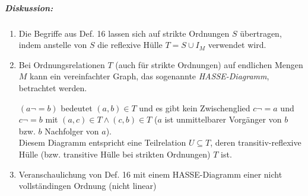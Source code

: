 \subparagraph{Diskussion:} 
\begin{enumerate}
\item Die Begriffe aus Def. 16 lassen sich auf strikte Ordnungen $S$ übertragen, indem anstelle von $S$ die reflexive Hülle $T=S \cup I_M$ verwendet wird.
\item Bei Ordnungsrelationen $T$ (auch für strikte Ordnungen) auf endlichen Mengen $M$ kann ein vereinfachter Graph, das sogenannte \emph{HASSE-Diagramm}, betrachtet werden.\\
$(a\neg = b)$ bedeutet $(a,b) \in T$ und es gibt kein Zwischenglied $c \neg = a$ und $c\neg = b$ mit $(a,c) \in T \wedge (c,b) \in T$ ($a$ ist unmittelbarer Vorgänger von $b$ bzw. $b$ Nachfolger von $a$).\\
Diesem Diagramm entspricht eine Teilrelation $U \subseteq T$, deren transitiv-reflexive Hülle (bzw. transitive Hülle bei strikten Ordnungen) $T$ ist.
\item Veranschaulichung von Def. 16 mit einem HASSE-Diagramm einer nicht vollständingen Ordnung (nicht linear)\\
\end{enumerate}
